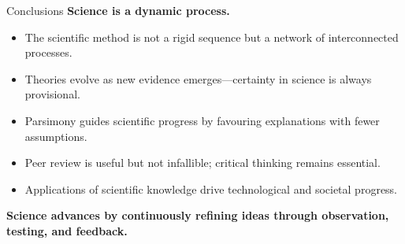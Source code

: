 \begin{frame}{Conclusions}
  \textbf{Science is a dynamic process.}

  \begin{itemize}
    \item The scientific method is not a rigid sequence but a
      network of interconnected processes.
    \item Theories evolve as new evidence emerges—certainty in
      science is always provisional.
    \item Parsimony guides scientific progress by favouring
      explanations with fewer assumptions.
    \item Peer review is useful but not infallible; critical
      thinking remains essential.
    \item Applications of scientific knowledge drive technological
      and societal progress.
  \end{itemize}

  \textbf{Science advances by continuously refining ideas through
  observation, testing, and feedback.}
\end{frame}
